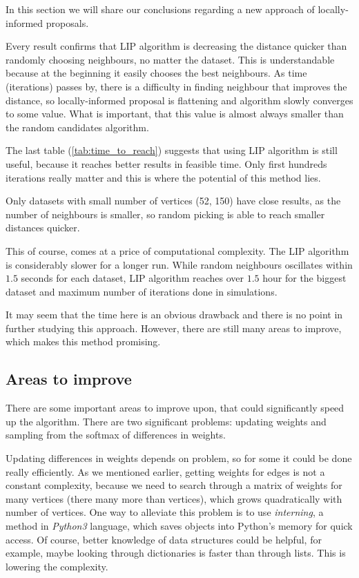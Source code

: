 In this section we will share our conclusions regarding a new approach of locally-informed proposals.

Every result confirms that LIP algorithm is decreasing the distance quicker than randomly choosing neighbours, no matter the dataset. This is understandable because at the beginning it easily chooses the best neighbours. As time (iterations) passes by, there is a difficulty in finding neighbour that improves the distance, so locally-informed proposal is flattening and algorithm slowly converges to some value. What is important, that this value is almost always smaller than the random candidates algorithm.

The last table (\ref{tab:time_to_reach}) suggests that using LIP algorithm is still useful, because it reaches better results in feasible time. Only first hundreds iterations really matter and this is where the potential of this method lies.

Only datasets with small number of vertices (52, 150) have close results, as the number of neighbours is smaller, so random picking is able to reach smaller distances quicker.

This of course, comes at a price of computational complexity. The LIP algorithm is considerably slower for a longer run. While random neighbours oscillates within $1.5$ seconds for each dataset, LIP algorithm reaches over $1.5$ hour for the biggest dataset and maximum number of iterations done in simulations.

It may seem that the time here is an obvious drawback and there is no point in further studying this approach. However, there are still many areas to improve, which makes this method promising.

\subsection{Areas to improve}
	There are some important areas to improve upon, that could significantly speed up the algorithm. There are two significant problems: updating weights and sampling from the softmax of differences in weights. 
	
	Updating differences in weights depends on problem, so for some it could be done really efficiently. As we mentioned earlier, getting weights for edges is not a constant complexity, because we need to search through a matrix of weights for many vertices (there many more than vertices), which grows quadratically with number of vertices. One way to alleviate this problem is to use \textit{interning}, a method in \textit{Python3} language, which saves objects into Python's memory for quick access. Of course, better knowledge of data structures could be helpful, for example, maybe looking through dictionaries is faster than through lists. This is lowering the complexity.
	
